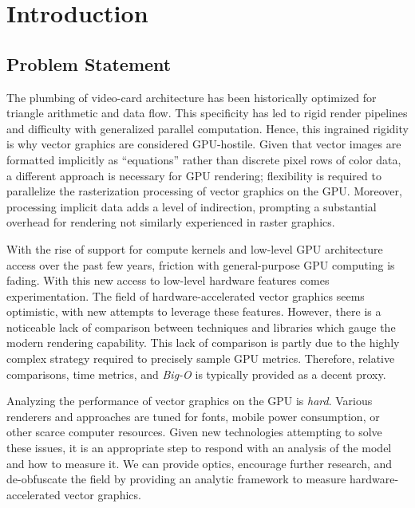 \section{Introduction}\label{sec:introduction}

\subsection{Problem Statement}\label{sec:problem_statement}
The plumbing of video-card architecture has been historically optimized for triangle arithmetic and data flow. This specificity has led to rigid render pipelines and difficulty with generalized parallel computation. Hence, this ingrained rigidity is why vector graphics are considered GPU-hostile. Given that vector images are formatted implicitly as ``equations'' rather than discrete pixel rows of color data, a different approach is necessary for GPU rendering; flexibility is required to parallelize the rasterization processing of vector graphics on the GPU. Moreover, processing implicit data adds a level of indirection, prompting a substantial overhead for rendering not similarly experienced in raster graphics.\medskip

With the rise of support for compute kernels and low-level GPU architecture access over the past few years, friction with general-purpose GPU computing is fading. With this new access to low-level hardware features comes experimentation. The field of hardware-accelerated vector graphics seems optimistic, with new attempts to leverage these features. However, there is a noticeable lack of comparison between techniques and libraries which gauge the modern rendering capability. This lack of comparison is partly due to the highly complex strategy required to precisely sample GPU metrics. Therefore, relative comparisons, time metrics, and \textit{Big-O} is typically provided as a decent proxy.\medskip

Analyzing the performance of vector graphics on the GPU is \emph{hard}. Various renderers and approaches are tuned for fonts, mobile power consumption, or other scarce computer resources. Given new technologies attempting to solve these issues, it is an appropriate step to respond with an analysis of the model and how to measure it. We can provide optics, encourage further research, and de-obfuscate the field by providing an analytic framework to measure hardware-accelerated vector graphics.

